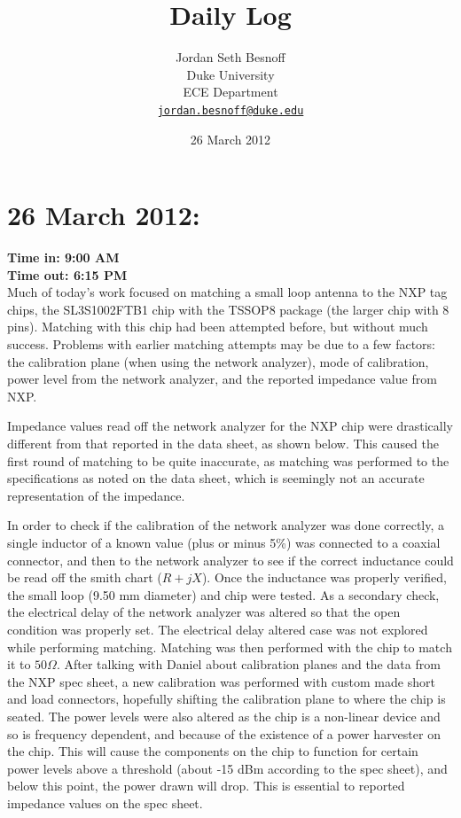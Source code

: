\documentclass[12pt,onecolumn,titlepage]{article}
\title{Daily Log}
\author{Jordan Seth Besnoff \\ Duke University \\ ECE Department \\ \href{mailto:jordan.besnoff@duke.edu}{\nolinkurl{jordan.besnoff@duke.edu}}}
\date{26 March 2012} %
\begin{document}
\maketitle
\tableofcontents

\newpage

\section{26 March 2012:}

\textbf{Time in: 9:00 AM} \\
\textbf{Time out: 6:15 PM} \\

Much of today's work focused on matching a small loop antenna to the NXP tag chips, the SL3S1002FTB1 chip with the TSSOP8 package (the larger chip with 8 pins). Matching with this chip had been attempted before, but without much success. Problems with earlier matching attempts may be due to a few factors: the calibration plane (when using the network analyzer), mode of calibration, power level from the network analyzer, and the reported impedance value from NXP. 

Impedance values read off the network analyzer for the NXP chip were drastically different from that reported in the data sheet, as shown below. This caused the first round of matching to be quite inaccurate, as matching was performed to the specifications as noted on the data sheet, which is seemingly not an accurate representation of the impedance. 

In order to check if the calibration of the network analyzer was done correctly, a single inductor of a known value (plus or minus 5\%) was connected to a coaxial connector, and then to the network analyzer to see if the correct inductance could be read off the smith chart ($R+jX$). Once the inductance was properly verified, the small loop (9.50 mm diameter) and chip were tested. As a secondary check, the electrical delay of the network analyzer was altered so that the open condition was properly set. The electrical delay altered case was not explored while performing matching. Matching was then performed with the chip to match it to $50 \Omega$. After talking with Daniel about calibration planes and the data from the NXP spec sheet, a new calibration was performed with custom made short and load connectors, hopefully shifting the calibration plane to where the chip is seated. The power levels were also altered as the chip is a non-linear device and so is frequency dependent, and because of the existence of a power harvester on the chip. This will cause the components on the chip to function for certain power levels above a threshold (about -15 dBm according to the spec sheet), and below this point, the power drawn will drop. This is essential to reported impedance values on the spec sheet.
\end{document}
